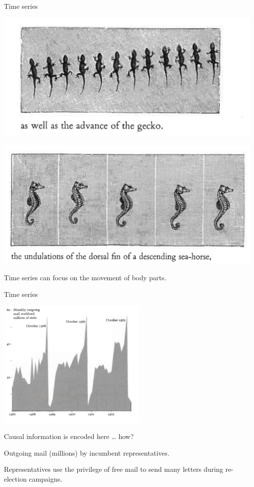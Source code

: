 \documentclass[
  ignorenonframetext,
]{beamer}
\begin{document}
\begin{frame}{Time series}
\label{time-series-5}
\centering
\begin{minipage}{0.55\textwidth}
\centering
\includegraphics[width=\textwidth]{excellence_figs/fig_19.png}
\end{minipage}
\hfill
\begin{minipage}{0.55\textwidth}
\centering
\includegraphics[width=\textwidth]{excellence_figs/fig_18.png}
\end{minipage}

Time series can focus on the movement of body parts.
\end{frame}

\begin{frame}{Time series}
\label{time-series-6}
\begin{center}
\includegraphics[width=0.55\textwidth]{excellence_figs/fig_20.png}
\end{center}

\footnotesize

Causal information is encoded here \ldots{} how?

Outgoing mail (millions) by incumbent representatives.

Representatives use the privilege of free mail to send many letters
during re-election campaigns.
\end{frame}
\end{document}
